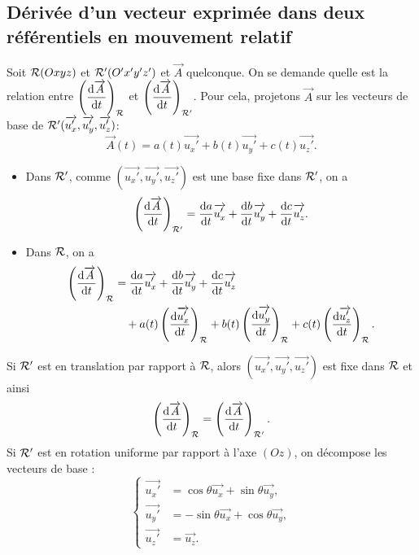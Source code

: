     \subsection{Dérivée d'un vecteur exprimée dans deux référentiels en mouvement relatif}

        Soit $\mathcal{R}(Oxyz)$ et $\mathcal{R}'(O'x'y'z')$ et $\vec{A}$ quelconque. On se demande quelle est la relation entre $\left(\dfrac{\mathrm{d}\protect\overrightarrow{{A}}}{\mathrm{d} t}\right)_{\mathcal{R}}$ et $\left(\dfrac{\mathrm{d}\protect\overrightarrow{{A}}}{\mathrm{d} t}\right)_{\mathcal{R}'}$. Pour cela, projetons $\vec{A}$ sur les vecteurs de base de $\mathcal{R}'(\protect\overrightarrow{{u_x'}},\protect\overrightarrow{{u_y'}},\protect\overrightarrow{{u_z'}})$:
        \begin{equation*}
            \vec{A}(t) = a(t)\vec{u_x'}+b(t)\vec{u_y'}+c(t)\vec{u_z'}.
        \end{equation*}

        \begin{itemize}
            \item Dans $\mathcal{R}'$, comme $(\vec{u_x'},\vec{u_y'},\vec{u_z'})$ est une base fixe dans $\mathcal{R}'$, on a 
            \begin{equation*}
                \left(\frac{\mathrm{d}\protect\overrightarrow{{A}}}{\mathrm{d} t}\right)_{\mathcal{R}'}=\dfrac{\mathrm{d} a}{\mathrm{d} t}\protect\overrightarrow{{u_x'}}+\dfrac{\mathrm{d} b}{\mathrm{d} t}\protect\overrightarrow{{u_y'}}+\dfrac{\mathrm{d} c}{\mathrm{d} t}\protect\overrightarrow{{u_z'}}.
            \end{equation*}
            \item Dans $\mathcal{R}$, on a 
            \begin{align*}
                \left(\frac{\mathrm{d}\protect\overrightarrow{{A}}}{\mathrm{d} t}\right)_{\mathcal{R}}
                &=\frac{\mathrm{d} a}{\mathrm{d} t}\protect\overrightarrow{{u_x'}}+\frac{\mathrm{d} b}{\mathrm{d} t}\protect\overrightarrow{{u_y'}}+\frac{\mathrm{d} c}{\mathrm{d} t}\protect\overrightarrow{{u_z'}}\\
                &\quad+a(t)\left(\frac{\mathrm{d}\protect\overrightarrow{{u_x'}}}{\mathrm{d} t}\right)_{\mathcal{R}}+b(t)\left(\frac{\mathrm{d}\protect\overrightarrow{{u_y'}}}{\mathrm{d} t}\right)_{\mathcal{R}}+c(t)\left(\frac{\mathrm{d}\protect\overrightarrow{{u_z'}}}{\mathrm{d} t}\right)_{\mathcal{R}}.
            \end{align*}
        \end{itemize}
        Si $\mathcal{R}'$ est en translation par rapport à $\mathcal{R}$, alors $(\vec{u_x'},\vec{u_y'},\vec{u_z'})$ est fixe dans $\mathcal{R}$ et ainsi 
        \begin{equation*}
            \left(\dfrac{\mathrm{d}\protect\overrightarrow{{A}}}{\mathrm{d} t}\right)_{\mathcal{R}}=\left(\dfrac{\mathrm{d}\protect\overrightarrow{{A}}}{\mathrm{d} t}\right)_{\mathcal{R}'}.
        \end{equation*}
        Si $\mathcal{R}'$ est en rotation uniforme par rapport à l'axe $(Oz)$, on décompose les vecteurs de base :
        \begin{equation*}
            \left\lbrace
            \begin{aligned}
                \vec{u_x'} &= \cos\theta\vec{u_x}+\sin\theta\vec{u_y},\\
                \vec{u_y'} &= -\sin\theta\vec{u_x}+\cos\theta\vec{u_y},\\
                \vec{u_z'} &= \vec{u_z}.
            \end{aligned}
            \right.
        \end{equation*}
